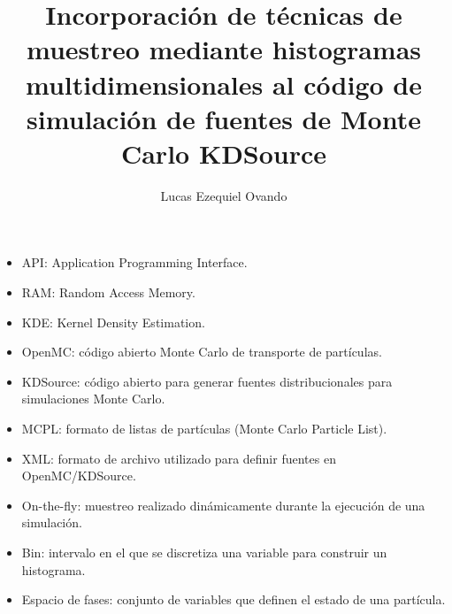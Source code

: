 \documentclass[12pt,screen,twoside,pagebackref]{ibtesis}
\title{Incorporación de técnicas de muestreo mediante histogramas multidimensionales al código de
simulación de fuentes de Monte Carlo KDSource}
\author{Lucas Ezequiel Ovando}
\begin{document}

\begin{preliminary}



\begin{abreviaturas}
\begin{itemize}
    \item API: Application Programming Interface.
    \item RAM: Random Access Memory.
    \item KDE: Kernel Density Estimation.
    \item OpenMC: código abierto Monte Carlo de transporte de partículas.
    \item KDSource: código abierto para generar fuentes distribucionales para simulaciones Monte Carlo.
    \item MCPL: formato de listas de partículas (Monte Carlo Particle List).
    \item XML: formato de archivo utilizado para definir fuentes en OpenMC/KDSource.
    \item On-the-fly: muestreo realizado dinámicamente durante la ejecución de una simulación.
    \item Bin: intervalo en el que se discretiza una variable para construir un histograma.
    \item Espacio de fases: conjunto de variables que definen el estado de una partícula.
\end{itemize}                            
\end{abreviaturas}

\tableofcontents                %

\listoffigures                  %

\listoftables                   %



\end{preliminary}




% 




\end{document}
